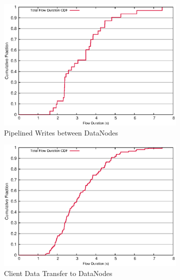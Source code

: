\begin{figure}[!htbp]
\begin{subfigure}[b]{.45\linewidth}
	\includegraphics[width=.99\textwidth]{figures/6writes/36_44_type_flow_duration.eps} 
	\caption{Pipelined Writes between DataNodes}\label{fig:write_duration:pipe_write}
   \end{subfigure} %
  \begin{subfigure}[b]{.45\linewidth}
   \centering
	\includegraphics[width=.99\textwidth]{figures/6writes/32_36_type_flow_duration.eps} 
	\caption{Client Data Transfer to DataNodes}\label{fig:write_duration:client_write}
   \end{subfigure} \\%
  \begin{subfigure}[b]{.45\linewidth}
   \centering

\end{subfigure}
\end{figure}
